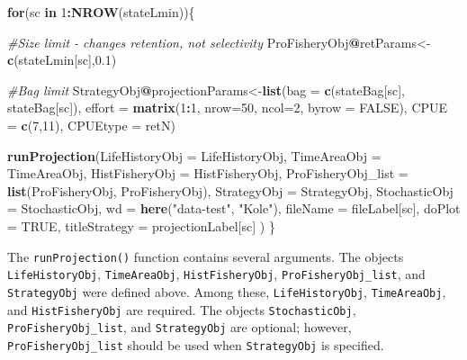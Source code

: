 \documentclass[
]{book}
\newenvironment{Shaded}{\begin{snugshade}}{\end{snugshade}}
\newcommand{\AttributeTok}[1]{\textcolor[rgb]{0.13,0.29,0.53}{#1}}
\newcommand{\CommentTok}[1]{\textcolor[rgb]{0.56,0.35,0.01}{\textit{#1}}}
\newcommand{\ConstantTok}[1]{\textcolor[rgb]{0.56,0.35,0.01}{#1}}
\newcommand{\ControlFlowTok}[1]{\textcolor[rgb]{0.13,0.29,0.53}{\textbf{#1}}}
\newcommand{\DecValTok}[1]{\textcolor[rgb]{0.00,0.00,0.81}{#1}}
\newcommand{\FloatTok}[1]{\textcolor[rgb]{0.00,0.00,0.81}{#1}}
\newcommand{\FunctionTok}[1]{\textcolor[rgb]{0.13,0.29,0.53}{\textbf{#1}}}
\newcommand{\NormalTok}[1]{#1}
\newcommand{\OtherTok}[1]{\textcolor[rgb]{0.56,0.35,0.01}{#1}}
\newcommand{\SpecialCharTok}[1]{\textcolor[rgb]{0.81,0.36,0.00}{\textbf{#1}}}
\newcommand{\StringTok}[1]{\textcolor[rgb]{0.31,0.60,0.02}{#1}}
\begin{document}
\begin{Shaded}
\begin{Highlighting}[]
\ControlFlowTok{for}\NormalTok{(sc }\ControlFlowTok{in} \DecValTok{1}\SpecialCharTok{:}\FunctionTok{NROW}\NormalTok{(stateLmin))\{}

  \CommentTok{\#Size limit {-} changes retention, not selectivity}
\NormalTok{  ProFisheryObj}\SpecialCharTok{@}\NormalTok{retParams}\OtherTok{\textless{}{-}}\FunctionTok{c}\NormalTok{(stateLmin[sc],}\FloatTok{0.1}\NormalTok{)}

  \CommentTok{\#Bag limit}
\NormalTok{StrategyObj}\SpecialCharTok{@}\NormalTok{projectionParams}\OtherTok{\textless{}{-}}\FunctionTok{list}\NormalTok{(}\AttributeTok{bag =} \FunctionTok{c}\NormalTok{(stateBag[sc], stateBag[sc]), }\AttributeTok{effort =} \FunctionTok{matrix}\NormalTok{(}\DecValTok{1}\SpecialCharTok{:}\DecValTok{1}\NormalTok{, }\AttributeTok{nrow=}\DecValTok{50}\NormalTok{, }\AttributeTok{ncol=}\DecValTok{2}\NormalTok{, }\AttributeTok{byrow =} \ConstantTok{FALSE}\NormalTok{), }\AttributeTok{CPUE =} \FunctionTok{c}\NormalTok{(}\DecValTok{7}\NormalTok{,}\DecValTok{11}\NormalTok{), }\AttributeTok{CPUEtype =} \StringTok{\textquotesingle{}retN\textquotesingle{}}\NormalTok{)}

  \FunctionTok{runProjection}\NormalTok{(}\AttributeTok{LifeHistoryObj =}\NormalTok{ LifeHistoryObj,}
                \AttributeTok{TimeAreaObj =}\NormalTok{ TimeAreaObj,}
                \AttributeTok{HistFisheryObj =}\NormalTok{ HistFisheryObj,}
                \AttributeTok{ProFisheryObj\_list =} \FunctionTok{list}\NormalTok{(ProFisheryObj, ProFisheryObj),}
                \AttributeTok{StrategyObj =}\NormalTok{ StrategyObj,}
                \AttributeTok{StochasticObj =}\NormalTok{ StochasticObj,}
                \AttributeTok{wd =} \FunctionTok{here}\NormalTok{(}\StringTok{"data{-}test"}\NormalTok{, }\StringTok{"Kole"}\NormalTok{),}
                \AttributeTok{fileName =}\NormalTok{ fileLabel[sc],}
                \AttributeTok{doPlot =} \ConstantTok{TRUE}\NormalTok{,}
                \AttributeTok{titleStrategy =}\NormalTok{ projectionLabel[sc]}
\NormalTok{  )}
\NormalTok{\}}
\end{Highlighting}
\end{Shaded}

The \texttt{runProjection()} function contains several arguments. The objects \texttt{LifeHistoryObj}, \texttt{TimeAreaObj}, \texttt{HistFisheryObj}, \texttt{ProFisheryObj\_list}, and \texttt{StrategyObj} were defined above. Among these, \texttt{LifeHistoryObj}, \texttt{TimeAreaObj}, and \texttt{HistFisheryObj} are required. The objects \texttt{StochasticObj}, \texttt{ProFisheryObj\_list}, and \texttt{StrategyObj} are optional; however, \texttt{ProFisheryObj\_list} should be used when \texttt{StrategyObj} is specified.
\end{document}
